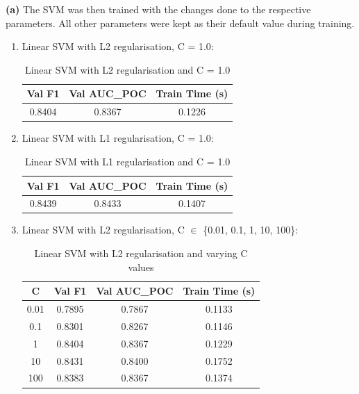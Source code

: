 \noindent\textbf{(a)} The SVM was then trained with the changes done to the respective parameters. All other parameters were kept as their default value during training.
\begin{enumerate}[label=\roman*., topsep=0pt, itemsep=2pt]
    \item Linear SVM with L2 regularisation, C = 1.0: 

        \begin{table}[h!]
        \caption{Linear SVM with L2 regularisation and C = 1.0}
        \centering
        \begin{tabular}{ccc}
            \hline
            \textbf{Val F1} & \textbf{Val AUC\_POC} & \textbf{Train Time (s)}\\
            \hline
            0.8404 & 0.8367 & 0.1226\\
            \hline
        \end{tabular}
        \label{linear_l2}
        \end{table}

    \item Linear SVM with L1 regularisation, C = 1.0: 

        \begin{table}[h!]
        \caption{Linear SVM with L1 regularisation and C = 1.0}
        \centering
        \begin{tabular}{ccc}
            \hline
            \textbf{Val F1} & \textbf{Val AUC\_POC} & \textbf{Train Time (s)}\\
            \hline
            0.8439 & 0.8433 & 0.1407\\
            \hline
        \end{tabular}
        \label{linear_l1}
        \end{table}

    \newpage

    \item Linear SVM with L2 regularisation, C $\in$ \{0.01, 0.1, 1, 10, 100\}:

        \begin{table}[h!]
        \caption{Linear SVM with L2 regularisation and varying C values}
        \centering
        \begin{tabular}{cccc}
            \hline
            C & \textbf{Val F1} & \textbf{Val AUC\_POC} & \textbf{Train Time (s)}\\
            \hline
            0.01 & 0.7895 & 0.7867 & 0.1133\\
            0.1 & 0.8301 & 0.8267 & 0.1146\\
            1 & 0.8404 & 0.8367 & 0.1229\\
            10 & 0.8431 & 0.8400 & 0.1752\\
            100 & 0.8383 & 0.8367 & 0.1374\\
            \hline
        \end{tabular}
        \label{linear_l2_vary}
        \end{table}


\end{enumerate}
